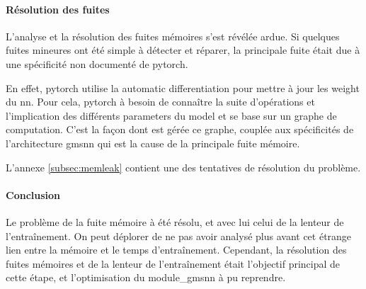 \paragraph{Résolution des fuites}
L'analyse et la résolution des fuites mémoires s'est révélée ardue. Si quelques fuites mineures ont été simple à détecter et réparer, la principale fuite était due à une spécificité non documenté de \gls{pytorch}.

En effet, \gls{pytorch} utilise la \gls{automatic differentiation} pour mettre à jour les \gls{weight} du \gls{nn}.
Pour cela, \gls{pytorch} à besoin de connaître la suite d'opérations et l'implication des différents \glspl{parameter} du \gls{model} et se base sur un \og graphe de computation\fg{}.
C'est la façon dont est gérée ce graphe, couplée aux spécificités de l'architecture \gls{gmsnn} qui est la cause de la principale fuite mémoire.

L'annexe \ref{subsec:memleak} contient une des tentatives de résolution du problème.


\paragraph{Conclusion}
Le problème de la fuite mémoire à été résolu, et avec lui celui de la lenteur de l'entraînement.
On peut déplorer de ne pas avoir analysé plus avant cet étrange lien entre la mémoire et le temps d'entraînement.
Cependant, la résolution des fuites mémoires et de la lenteur de l'entraînement était l'objectif principal de cette étape, et l'optimisation du \gls{module_gmsnn} à pu reprendre.